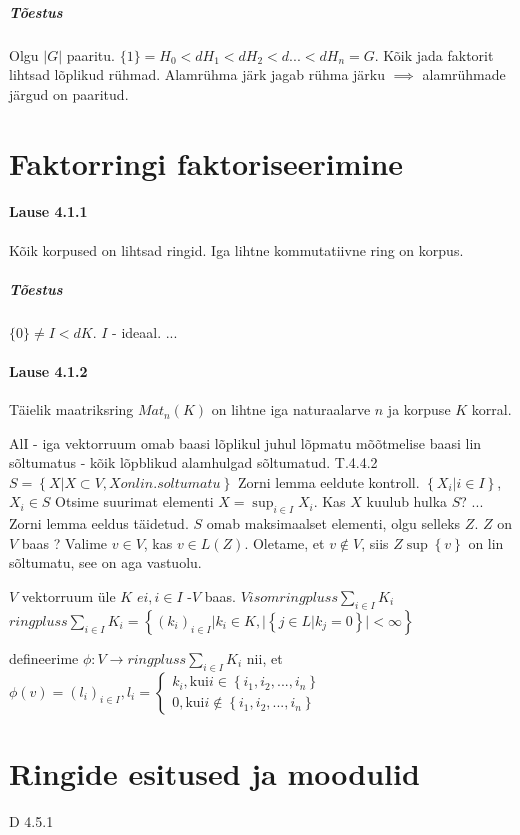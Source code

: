 \documentclass[12pt]{report}
\numberwithin{equation}{section}
\theoremstyle{definition}
\theoremstyle{plain}
\begin{document}
\subparagraph{Tõestus}
Olgu $|G|$ paaritu. $\{1\} = H_0 <d H_1 <d H_2 <d ... <d H_n = G$. Kõik jada faktorit lihtsad lõplikud rühmad. Alamrühma järk jagab rühma järku $\implies$ alamr\"uhmade järgud on paaritud. 

\section{Faktorringi faktoriseerimine}

\paragraph{Lause 4.1.1} Kõik korpused on lihtsad ringid. Iga lihtne kommutatiivne ring on korpus. 

\subparagraph{Tõestus} $\{0\} \neq I <d K$. $I$ - ideaal. ...

\paragraph{Lause 4.1.2} Täielik maatriksring $Mat_n (K)$ on lihtne iga naturaalarve $n$ ja korpuse $K$ korral. 


AlI - iga vektorruum omab baasi lõplikul juhul
lõpmatu mõõtmelise baasi lin sõltumatus - kõik lõpblikud alamhulgad sõltumatud.
T.4.4.2
$S = \left\{ X | X \subset V, X on lin. soltumatu \right\}$
Zorni lemma eeldute kontroll.
$\left\{ X_i | i \in I \right\}$, $X_i \in S$ Otsime suurimat elementi
$X = \sup_{i \in I} X_i$. Kas $X$ kuulub hulka $S$?
...
Zorni lemma eeldus täidetud.
$S$ omab maksimaalset elementi, olgu selleks $Z$. $Z$ on $V$ baas ? 
Valime $v \in V$, kas $v \in L(Z)$. Oletame, et $v \not \in V$, siis $Z \sup \left\{ v \right\}$ on lin sõltumatu, see on aga vastuolu.

$V$ vektorruum \"ule $K$
$ei, i \in I$ -$V$ baas.
$V isom ringpluss \sum \limits_{i \in I} K_i$
$ringpluss \sum \limits_{i \in I} K_i = \left\{ (k_i)_{i \in I} | k_i \in K, | \left\{ j \in L | k_j = 0 \right\} | < \infty \right\}$

defineerime $\phi: V \to ringpluss \sum \limits_{i \in I} K_i$ nii, et $\phi(v) = (l_i)_{i \in I}, l_i = \begin{cases} k_i, \text{kui} i \in \left\{ i_1,i_2,...,i_n \right\} \\
0, \text{kui} i \not \in \left\{ i_1,i_2,...,i_n \right\}
\end{cases}$

\section{Ringide esitused ja moodulid}
D 4.5.1
\end{document}

